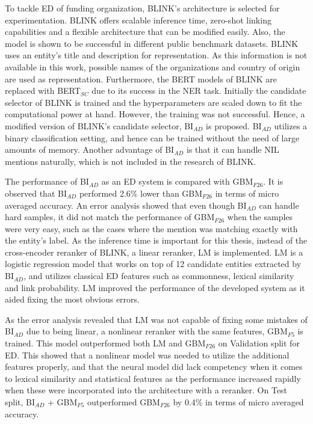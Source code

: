 \documentclass{report}
\theoremstyle{definition}
\theoremstyle{remark}
\begin{document}
To tackle ED of funding organization, BLINK's architecture is selected for experimentation. BLINK offers scalable inference time, zero-shot linking capabilities and a flexible architecture that can be modified easily. Also, the model is shown to be successful in different public benchmark datasets. BLINK uses an entity's title and description for representation. As this information is not available in this work, possible names of the organizations and country of origin are used as representation. Furthermore, the BERT models of BLINK are replaced with BERT$_{SC}$ due to its success in the NER task. Initially the candidate selector of BLINK is trained and the hyperparameters are scaled down to fit the computational power at hand. However, the training was not successful. Hence, a modified version of BLINK's candidate selector, BI$_{AD}$ is proposed. BI$_{AD}$ utilizes a binary classification setting, and hence can be trained without the need of large amounts of memory. Another advantage of BI$_{AD}$ is that it can handle NIL mentions naturally, which is not included in the research of BLINK.

The performance of BI$_{AD}$ as an ED system is compared with GBM$_{F26}$. It is observed that BI$_{AD}$ performed 2.6\% lower than GBM$_{F26}$ in terms of micro averaged accuracy. An error analysis showed that even though BI$_{AD}$ can handle hard samples, it did not match the performance of GBM$_{F26}$ when the samples were very easy, such as the cases where the mention was matching exactly with the entity's label. As the inference time is important for this thesis, instead of the cross-encoder reranker of BLINK, a linear reranker, LM is implemented. LM is a logistic regression model that works on top of 12 candidate entities extracted by BI$_{AD}$, and utilizes classical ED features such as commonness, lexical similarity and link probability. LM improved the performance of the developed system as it aided fixing the most obvious errors. 

As the error analysis revealed that LM was not capable of fixing some mistakes of BI$_{AD}$ due to being linear, a nonlinear reranker with the same features, GBM$_{F5}$ is trained. This model outperformed both LM and GBM$_{F26}$ on Validation split for ED. This showed that a nonlinear model was needed to utilize the additional features properly, and that the neural model did lack competency when it comes to lexical similarity and statistical features as the performance increased rapidly when these were incorporated into the architecture with a reranker. On Test split, BI$_{AD}$ + GBM$_{F5}$ outperformed GBM$_{F26}$ by 0.4\% in terms of micro averaged accuracy. 
\end{document}
